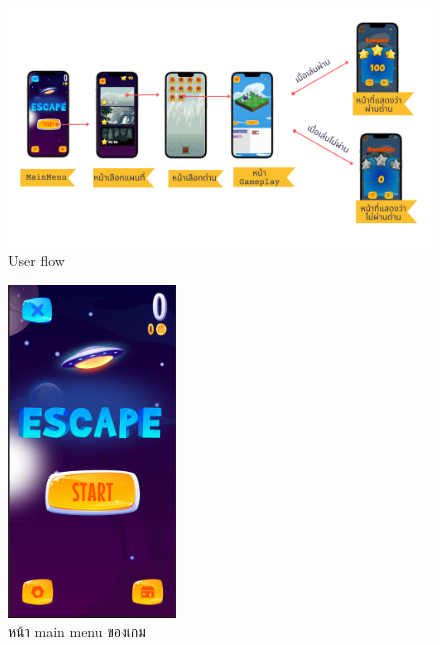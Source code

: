 \begin{figure}[h!]
    \begin{center}
    \includegraphics [width=\textwidth] {pic/UXflowchart.png}
    \end{center}
    \caption{User flow}
    \label{userflow}
    \end{figure}

\begin{figure}[h!]
\begin{center}
\includegraphics[width=1.75in]{pic/home_start.PNG}
\end{center}
\caption[Mainmenu ของเกม]{หน้า main menu ของเกม}
\label{mainmenu}
\end{figure}


